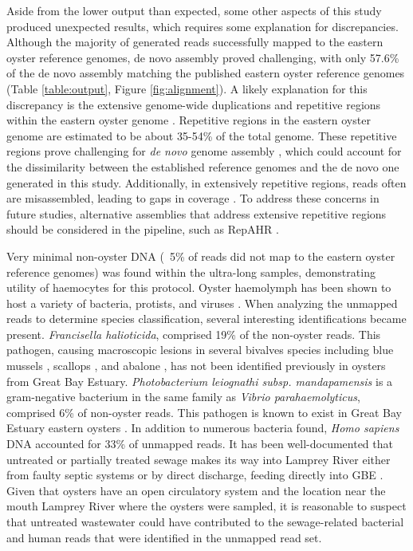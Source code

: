 \documentclass[lineno,referee,pdflatex,sn-basic]{sn-jnl}%
\begin{document}
Aside from the lower output than expected, some other aspects of this study produced unexpected results, which requires some explanation for discrepancies. Although the majority of generated reads successfully mapped to the eastern oyster reference genomes, de novo assembly proved challenging, with only 57.6\% of the de novo assembly matching the published eastern oyster reference genomes (Table \ref{table:output}, Figure \ref{fig:alignment}). A likely explanation for this discrepancy is the extensive genome-wide duplications and repetitive regions within the eastern oyster genome \cite{kamalay_dna_1976, modak_extensive_2021}. Repetitive regions in the eastern oyster genome are estimated to be about 35-54\% of the total genome. These repetitive regions prove challenging for \textit{de novo} genome assembly \cite{liao_current_2019}, which could account for the dissimilarity between the established reference genomes and the de novo one generated in this study. Additionally, in extensively repetitive regions, reads often are misassembled, leading to gaps in coverage \cite{treangen_repetitive_2012, wang_read_2019}. To address these concerns in future studies, alternative assemblies that address extensive repetitive regions should be considered in the pipeline, such as RepAHR \cite{liao_current_2019}.

Very minimal non-oyster DNA (~5\% of reads did not map to the eastern oyster reference genomes) was found within the ultra-long samples, demonstrating utility of haemocytes for this protocol. Oyster haemolymph has been shown to host a variety of bacteria, protists, and viruses \cite{dupont_oyster_2020}. When analyzing the unmapped reads to determine species classification, several interesting identifications became present. \textit{Francisella halioticida}, comprised 19\% of the non-oyster reads. This pathogen, causing macroscopic lesions in several bivalves species including blue mussels \cite{bouras_influence_2024, cano_first_2022}, scallops \cite{kawahara_parallel_2019, kawahara_four-year_2024}, and abalone \cite{brevik_francisella_2011, kamaishi_mass_2010}, has not been identified previously in oysters from Great Bay Estuary. \textit{Photobacterium leiognathi subsp. mandapamensis} is a gram-negative bacterium in the same family as \textit{Vibrio parahaemolyticus}, comprised 6\% of non-oyster reads. This pathogen is known to exist in Great Bay Estuary eastern oysters \cite{hartwick_forecasting_2019}. In addition to numerous bacteria found, \textit{Homo sapiens} DNA accounted for 33\% of unmapped reads. It has been well-documented that untreated or partially treated sewage makes its way into Lamprey River either from faulty septic systems or by direct discharge, feeding directly into GBE \cite{piscataqua_region_estuaries_partnership_state_2023}. Given that oysters have an open circulatory system and the location near the mouth Lamprey River where the oysters were sampled, it is reasonable to suspect that untreated wastewater could have contributed to the sewage-related bacterial and human reads that were identified in the unmapped read set.
\end{document}
